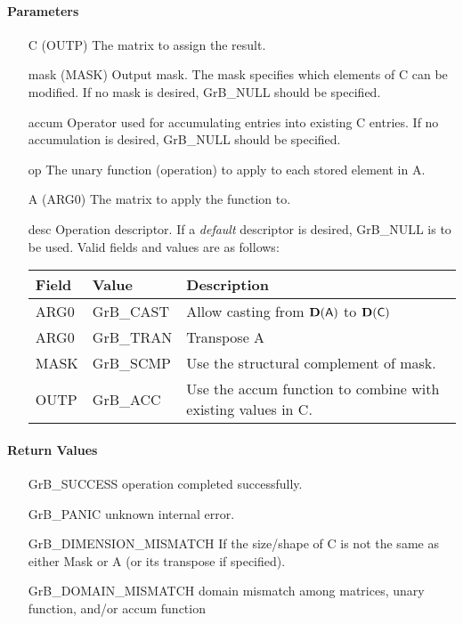 \paragraph{Parameters}

\begin{itemize}[leftmargin=1.1in]
    \item[{\sf C}]     ({\sf OUTP}) The matrix to assign the result.

    \item[{\sf mask}]  ({\sf MASK}) Output mask. The mask
    specifies which elements of {\sf C} can be modified.
    If no mask is desired, {\sf GrB\_NULL} should be specified.

    \item[{\sf accum}]  Operator used for accumulating entries into existing {\sf C} entries. 
			If no accumulation is desired, {\sf GrB\_NULL} should be specified.

    \item[{\sf op}]    The unary function (operation) to apply to each stored element in {\sf A}.
    \item[{\sf A}]     ({\sf ARG0}) The matrix to apply the function to.
    \item[{\sf desc}]  Operation descriptor. If a
    \emph{default} descriptor is desired, {\sf GrB\_NULL} is to be
    used.  Valid fields and values are as follows: \\
    \begin{tabular}{lll}
    Field  & Value & Description \\
    \hline
    {\sf ARG0} & {\sf GrB\_CAST} & Allow casting from $\bold{D}({\sf A})$ to $\bold{D}({\sf C})$ \\
    {\sf ARG0} & {\sf GrB\_TRAN} & Transpose {\sf A} \\
    {\sf MASK} & {\sf GrB\_SCMP} & Use the structural complement of {\sf mask}. \\
    {\sf OUTP}& {\sf GrB\_ACC}  & Use the {\sf accum} function to combine with existing values in {\sf C}.\\
    \end{tabular}
\end{itemize}

\paragraph{Return Values}

\begin{itemize}[leftmargin=2.1in]
\item[{\sf GrB\_SUCCESS}]     operation completed successfully.
\item[{\sf GrB\_PANIC}]        unknown internal error.
\item[{\sf GrB\_DIMENSION\_MISMATCH}]            
        If the size/shape of {\sf C} is not the same as either {\sf Mask} or {\sf A} (or its transpose if specified).
\item[{\sf GrB\_DOMAIN\_MISMATCH}]  
        domain mismatch among matrices, unary function, and/or
        accum function 
\end{itemize}

